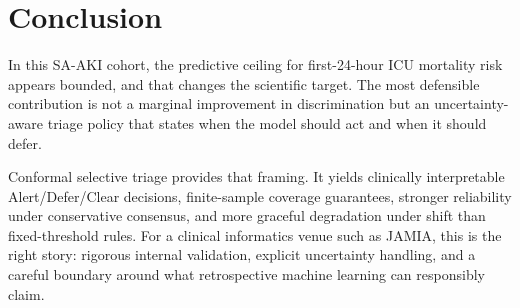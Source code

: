 \documentclass[unnumsec,webpdf,contemporary,large,numbered,nocrop]{oup-authoring-template}
\begin{document}
\section{Conclusion}
In this SA-AKI cohort, the predictive ceiling for first-24-hour ICU mortality risk appears bounded, and that changes the scientific target. The most defensible contribution is not a marginal improvement in discrimination but an uncertainty-aware triage policy that states when the model should act and when it should defer.

Conformal selective triage provides that framing. It yields clinically interpretable Alert/Defer/Clear decisions, finite-sample coverage guarantees, stronger reliability under conservative consensus, and more graceful degradation under shift than fixed-threshold rules. For a clinical informatics venue such as JAMIA, this is the right story: rigorous internal validation, explicit uncertainty handling, and a careful boundary around what retrospective machine learning can responsibly claim.
\end{document}
